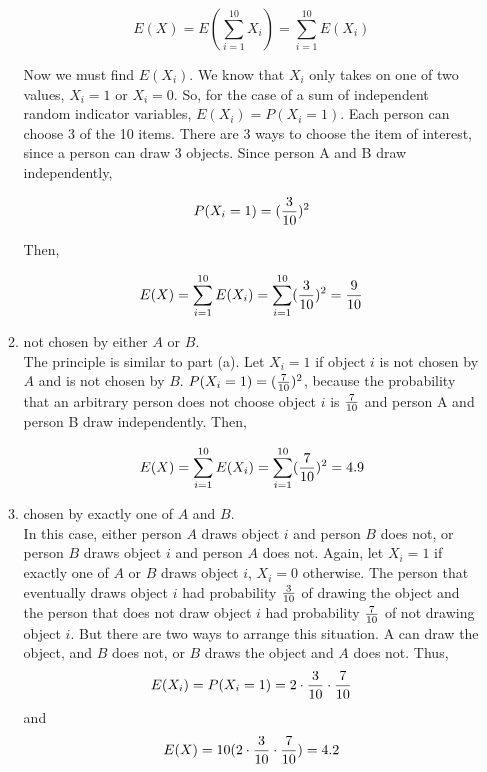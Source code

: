 \documentclass[12pt]{article}%
\newcommand{\0}{{\bf 0}}
\begin{document}
\begin{enumerate}
\begin{enumerate}
$$E(X)=E(\sum_{i=1}^{10} X_i)=\sum_{i=1}^{10} E(X_i)$$

Now we must find $E(X_i)$. We know that $X_i$ only takes on one of two values, $X_i = 1$ or
 $X_i = 0$. So, for the case of a sum of independent random indicator variables, $E(X_i) =
 P(X_i = 1)$.
 Each person can choose 3 of the 10 items. There are 3 ways to choose the item of
 interest, since a person can draw 3 objects. Since person A and B draw independently,

$$P(X_i=1)=(\frac{3}{10})^2$$

Then,

$$E(X)=\sum_{i=1}^{10} E(X_i)=\sum_{i=1}^{10} (\frac{3}{10})^2 =\frac{9}{10}$$




\item not chosen by either $A$  or $B$.
\\
{\color{blue}{\bf Sol.}}
The principle is similar to part (a). Let $X_i = 1$ if object $i$ is not chosen by $A$ and is not chosen by $B$. $P(X_i = 1) = (\frac{7}{10})^2$, because the probability that an arbitrary person does
 not choose object $i$ is $\frac{7}{10}$ and person A and person B draw independently. Then,

$$E(X)=\sum_{i=1}^{10} E(X_i)=\sum_{i=1}^{10} (\frac{7}{10})^2 =4.9$$




\item chosen by exactly one of $A$ and $B$.
\\
{\color{blue}{\bf Sol.}}
In this case, either person $A$ draws object $i$ and person $B$ does not, or person $B$ draws object $i$ and person $A$ does not. Again, let $X_i = 1$ if exactly one of $A$ or $B$ draws object $i$, $X_i = 0$ otherwise. The person that eventually draws object $i$ had probability $\frac{3}{10}$ of
 drawing the object and the person that does not draw object $i$ had probability $\frac{7}
 {10}$ of not drawing object $i$. But there are two ways to arrange this situation. A can draw the
 object, and $B$ does not, or $B$ draws the object and $A$ does not. Thus,
$$E(X_i)=P(X_i=1)=2 \cdot \frac{3}{10} \cdot \frac{7}{10}$$
and
$$E(X)=10(2\cdot\frac{3}{10}\cdot \frac{7}{10})=4.2$$


\end{enumerate}
 
 
 
 
 





\end{enumerate}
\end{document}
